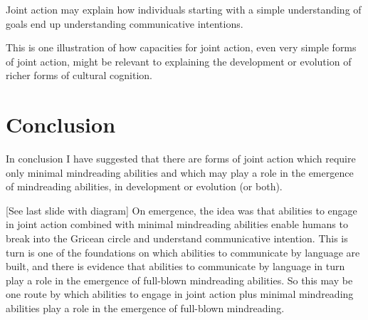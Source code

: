 \documentclass[12pt,a4paper]{extarticle}
\begin{document}
Joint action may explain how individuals starting with a simple understanding of goals end up understanding communicative intentions.

This is one illustration of how capacities for joint action, even very simple forms of joint action, might be relevant to explaining the development or evolution of richer forms of cultural cognition.



\section{Conclusion}
In conclusion I have suggested that there are forms of joint action which require only minimal mindreading abilities and which may play a role in the emergence of mindreading abilities, in development or evolution (or both).

[See last slide with diagram] On emergence, the idea was that abilities to engage in joint action combined with minimal mindreading abilities enable humans to break into the Gricean circle and understand communicative intention.
This is turn is one of the foundations on which abilities to communicate by language are built,
and there is evidence that abilities to communicate by language in turn play a role in the emergence of full-blown mindreading abilities.
So this may be one route by which abilities to engage in joint action plus minimal mindreading abilities play a role in the emergence of full-blown mindreading.




\end{document}

